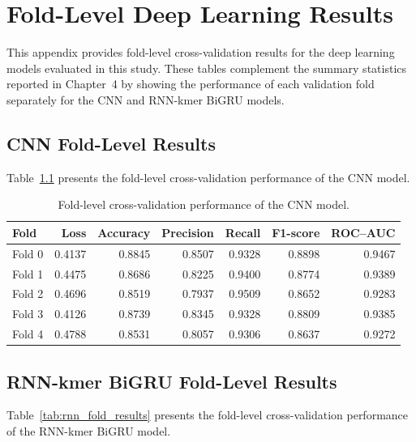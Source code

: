 \chapter{Fold-Level Deep Learning Results}
\label{app:dl_fold_results}

This appendix provides fold-level cross-validation results for the deep learning models evaluated in this study. These tables complement the summary statistics reported in Chapter~4 by showing the performance of each validation fold separately for the CNN and RNN-kmer BiGRU models.

\section{CNN Fold-Level Results}
\label{app:cnn_fold_results}

Table~\ref{tab:cnn_fold_results} presents the fold-level cross-validation performance of the CNN model.

\begin{table}[H]
\centering
\small
\caption{Fold-level cross-validation performance of the CNN model.}
\label{tab:cnn_fold_results}
\begin{tabular}{lrrrrrr}
\toprule
Fold & Loss & Accuracy & Precision & Recall & F1-score & ROC--AUC \\
\midrule
Fold 0 & 0.4137 & 0.8845 & 0.8507 & 0.9328 & 0.8898 & 0.9467 \\
Fold 1 & 0.4475 & 0.8686 & 0.8225 & 0.9400 & 0.8774 & 0.9389 \\
Fold 2 & 0.4696 & 0.8519 & 0.7937 & 0.9509 & 0.8652 & 0.9283 \\
Fold 3 & 0.4126 & 0.8739 & 0.8345 & 0.9328 & 0.8809 & 0.9385 \\
Fold 4 & 0.4788 & 0.8531 & 0.8057 & 0.9306 & 0.8637 & 0.9272 \\
\bottomrule
\end{tabular}
\end{table}

\FloatBarrier

\section{RNN-kmer BiGRU Fold-Level Results}
\label{app:rnn_fold_results}

Table~\ref{tab:rnn_fold_results} presents the fold-level cross-validation performance of the RNN-kmer BiGRU model.

